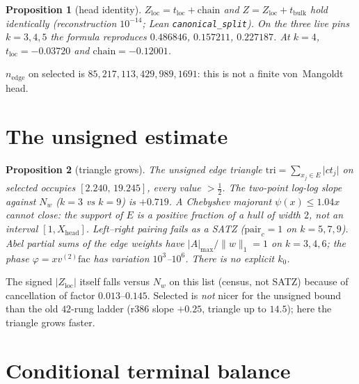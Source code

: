 \documentclass[11pt]{article}
\newtheorem{prop}{Proposition}
\theoremstyle{remark}
\newcommand{\Zloc}{Z_{\mathrm{loc}}}
\begin{document}
\begin{prop}[head identity]\label{prop:id}
$\Zloc=t_{\mathrm{loc}}+\mathrm{chain}$
and $Z=\Zloc+t_{\mathrm{bulk}}$ hold
identically (reconstruction $10^{-14}$;
Lean \texttt{canonical\_split}).
On the three live pins
$k=3,4,5$ the formula reproduces
$0.486846$, $0.157211$, $0.227187$.
At $k=4$,
$t_{\mathrm{loc}}=-0.03720$ and
$\mathrm{chain}=-0.12001$.
\end{prop}

$n_{\mathrm{edge}}$ on selected is
$85,217,113,429,989,1691$:
this is not a finite von~Mangoldt head.

\section{The unsigned estimate}\label{sec:tri}

\begin{prop}[triangle grows]\label{prop:tri}
The unsigned edge triangle
$\mathrm{tri}=\sum_{x_j\in E}\lvert ct_j\rvert$
on selected occupies $[2.240,\,19.245]$,
every value $>\tfrac12$.
The two-point log-log slope against $N_w$
($k=3$ vs $k=9$) is $+0.719$.
A Chebyshev majorant $\psi(x)\le 1.04x$
cannot close: the support of $E$ is a
positive fraction of a hull of width $2$,
not an interval $[1,X_{\mathrm{head}}]$.
Left--right pairing fails as a SATZ
($\mathrm{pair}_c=1$ on $k=5,7,9$).
Abel partial sums of the edge weights
have $\lvert A\rvert_{\max}/\lVert w\rVert_1=1$
on $k=3,4,6$; the phase $\varphi=xv^{(2)}\mathrm{fac}$
has variation $10^3$--$10^6$.
There is no explicit $k_0$.
\end{prop}

The signed $\lvert\Zloc\rvert$ itself falls
versus $N_w$ on this list (census, not SATZ)
because of cancellation of factor
$0.013$--$0.145$.
Selected is \emph{not} nicer for the
unsigned bound than the old $42$-rung
ladder (r386 slope $+0.25$, triangle up
to $14.5$); here the triangle grows faster.

\section{Conditional terminal balance}\label{sec:bal}
\end{document}
